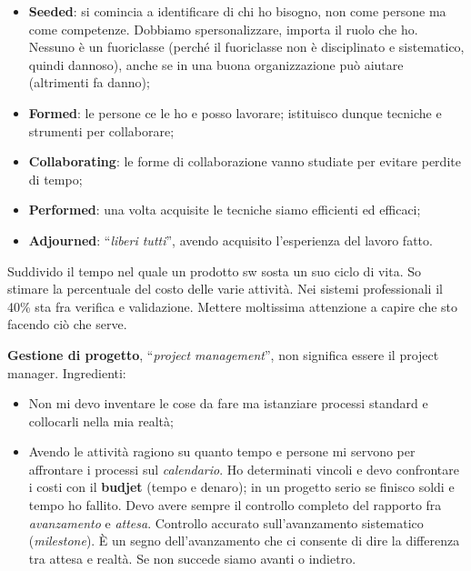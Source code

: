 \begin{itemize}

	\item \textbf{Seeded}: si comincia a identificare di chi ho bisogno, non come persone ma come competenze. Dobbiamo spersonalizzare, importa il ruolo che ho. Nessuno è un fuoriclasse (perché il fuoriclasse non è disciplinato e sistematico, quindi dannoso), anche se in una buona organizzazione può aiutare (altrimenti fa danno);
	
	\item \textbf{Formed}: le persone ce le ho e posso lavorare; istituisco dunque tecniche e strumenti per collaborare;
	
	\item \textbf{Collaborating}: le forme di collaborazione vanno studiate per evitare perdite di tempo;
	
	\item \textbf{Performed}: una volta acquisite le tecniche siamo efficienti ed efficaci;
	
	\item \textbf{Adjourned}: ``\textit{liberi tutti}'', avendo acquisito l'esperienza del lavoro fatto.

\end{itemize}

Suddivido il tempo nel quale un prodotto sw sosta un suo ciclo di vita. So stimare la percentuale del costo delle varie attività. Nei sistemi professionali il 40\% sta fra verifica e validazione. Mettere moltissima attenzione a capire che sto facendo ciò che serve.

\textbf{Gestione di progetto}, ``\textit{project management}'', non significa essere il project manager. Ingredienti:

\begin{itemize}

	\item Non mi devo inventare le cose da fare ma istanziare processi standard e collocarli nella mia realtà;
	
	\item Avendo le attività ragiono su quanto tempo e persone mi servono per affrontare i processi sul \textit{calendario}. Ho determinati vincoli e devo confrontare i costi con il \textbf{budjet} (tempo e denaro); in un progetto serio se finisco soldi e tempo ho fallito. Devo avere sempre il controllo completo del rapporto fra \textit{avanzamento} e \textit{attesa}. Controllo accurato sull'avanzamento sistematico (\textit{milestone}). È un segno dell'avanzamento che ci consente di dire la differenza tra attesa e realtà. Se non succede siamo avanti o indietro.

\end{itemize}

